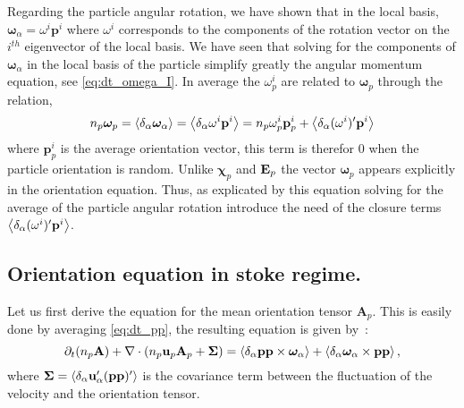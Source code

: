 Regarding the particle angular rotation, we have shown that in the local basis, $\bm\omega_\alpha  = \omega^i \textbf{p}^i$ where $\omega^i$ corresponds to the components of the rotation vector on the $i^{th}$ eigenvector of the local basis.
We have seen that solving for the components of $\bm\omega_\alpha$ in the local basis of the particle simplify greatly the angular momentum equation, see \ref{eq:dt_omega_I}.  
In average the $\omega^i_p$ are related to $\bm\omega_p$ through the relation, 
\begin{equation*}
    n_p \bm\omega_p
    = \left<\delta_\alpha \bm\omega_\alpha\right>
    =\left<\delta_\alpha \omega^i \textbf{p}^i\right>
    =n_p \omega^i_p   \textbf{p}_p^i
    +\left<\delta_\alpha (\omega^i)' \textbf{p}^i\right>
    \label{eq:omega_p_local}
\end{equation*}
where $\textbf{p}_p^i$ is the average orientation vector, this term is therefor $0$ when the particle orientation is random.  
Unlike $\bm\chi_p$ and $\textbf E_p$ the vector $\bm\omega_p$ appears explicitly in the orientation equation. 
Thus, as explicated by this equation solving for the average of the particle angular rotation introduce the need of the closure terms $\left<\delta_\alpha (\omega^i)' \textbf{p}^i\right>$.

\subsection{Orientation equation in stoke regime.}

Let us first derive the equation for the mean orientation tensor $\textbf{A}_p$. 
This is easily done by averaging \ref{eq:dt_pp}, the resulting equation is given by~:
\begin{equation}
    \partial_t (n_p\textbf{A})
    + \mathbf{\nabla}\cdot (
        n_p\textbf{u}_p\textbf{A}_p
        + \mathbf{\Sigma}
        )
    =
    \left<\delta_\alpha \textbf{pp} \times \bm\omega_\alpha\right>
    + \left<\delta_\alpha \bm\omega_\alpha \times \textbf{pp}\right>,
    \label{eq:avg_dt_pp_alpha}
\end{equation}
where $\mathbf{\Sigma} = \left<\delta_\alpha \textbf{u}'_\alpha(\textbf{pp})'\right>$ is the covariance term between the fluctuation of the velocity and the orientation tensor.

